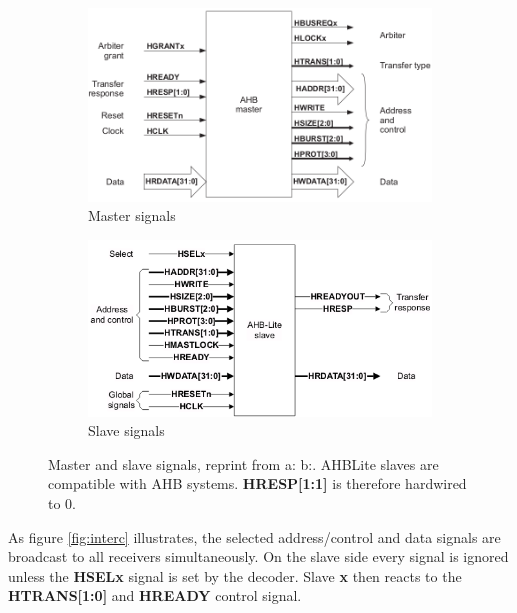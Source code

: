 \begin{figure}[ht!]
 \centering
 \begin{subfigure}[b]{0.4\linewidth}
 \includegraphics[width=\linewidth]{figs/AHB/master_signals.png}
 \caption{Master signals}
 \end{subfigure}
 \begin{subfigure}[b]{0.4\linewidth}
 \includegraphics[width=\linewidth]{figs/AHB/slave_lite.png}
 \caption{Slave signals}
 \end{subfigure}
 \caption{Master and slave signals, reprint from a:\cite{amba} b:\cite{amba3}. AHBLite slaves are compatible with AHB systems\cite{ambacomp}. \textbf{HRESP[1:1]} is therefore hardwired to 0.}
 \label{fig:ahbsig}
\end{figure}


As figure \ref{fig:interc} illustrates, the selected address/control and data signals are broadcast to all receivers simultaneously. On the slave side every signal is ignored unless the \textbf{HSELx} signal is set by the decoder. Slave \textbf{x} then reacts to the \textbf{HTRANS[1:0]} and \textbf{HREADY} control signal. \\

